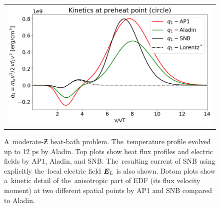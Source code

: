 \begin{figure}[htb]
\begin{center}
\begin{tabular}{c}
      \includegraphics[width=\figscale\textwidth]{../VFPdata/C7_Aladin_case3_nonlocal_kinetics.png}  
    \end{tabular}
  \caption{  
  A~moderate-$\Zbar$ heat-bath problem. The~temperature profile evolved 
  up to 12 ps by Aladin.
  Top plots show heat flux profiles and electric fields by AP1, Aladin, 
  and SNB. The~resulting current of SNB using explicitly the~local electric 
  field $\boldsymbol{E}_L$ is also shown. Botom plots show a~kinetic detail of
  the~anisotropic part of EDF (its flux velocity moment) at two different 
  spatial points by AP1 and SNB compared to Aladin. 
  }
  \label{fig:C7_Aladin_case3}
  \end{center} 
\end{figure}


